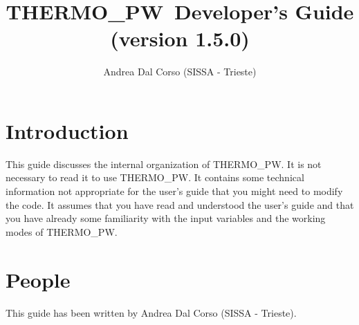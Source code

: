 \documentclass[12pt,a4paper]{article}
\def\version{1.5.0}
\def\tpw{{\sc THERMO\_PW}}
\begin{document}
\author{Andrea Dal Corso (SISSA - Trieste)}
\date{}


\title{
  \vskip 1cm
  {\color{red}\Huge \tpw\ Developer's Guide} \\
  \Large (version \version)
}
\maketitle

\newpage

\tableofcontents

\newpage

\section{\color{coral}Introduction}
This guide discusses the internal organization of \tpw. It is not necessary
to read it to use \tpw. It contains some technical information not 
appropriate for the user's guide that you might need to modify the code.
It assumes that you have read and understood the user's guide and that
you have already some familiarity with the input variables and 
the working modes of \tpw.

\section{\color{coral}People}
This guide has been written by Andrea Dal Corso (SISSA - Trieste). 

\newpage
\end{document}
